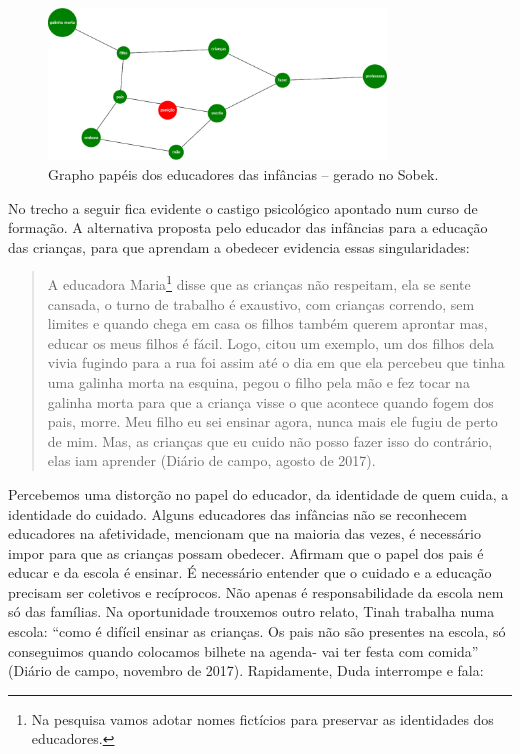 \documentclass{textolivre}
\begin{document}
\begin{figure}[h!]
 \centering
 \includegraphics[width=0.8\textwidth]{figure08.pdf}
 \caption{Grapho papéis dos educadores das infâncias -- gerado no Sobek.}
 \label{fig-fig08}
\end{figure}


No trecho a seguir fica evidente o castigo psicológico apontado num curso de formação. A alternativa proposta pelo educador das infâncias para a educação das crianças, para que aprendam a obedecer evidencia essas singularidades:

\begin{quote}
A educadora Maria\footnote{Na pesquisa vamos adotar nomes fictícios para preservar as identidades dos educadores.} disse que as crianças não respeitam, ela se sente cansada, o turno de trabalho é exaustivo, com crianças correndo, sem limites e quando chega em casa os filhos também querem aprontar mas, educar os meus filhos é fácil. Logo, citou um exemplo, um dos filhos dela vivia fugindo para a rua foi assim até o dia em que ela percebeu que tinha uma galinha morta na esquina, pegou o filho pela mão e fez tocar na galinha morta para que a criança visse o que acontece quando fogem dos pais, morre. Meu filho eu sei ensinar agora, nunca mais ele fugiu de perto de mim. Mas, as crianças que eu cuido não posso fazer isso do contrário, elas iam aprender (Diário de campo, agosto de 2017). 
\end{quote}

Percebemos uma distorção no papel do educador, da identidade de quem cuida, a identidade do cuidado. Alguns educadores das infâncias não se reconhecem educadores na afetividade, mencionam que na maioria das vezes, é necessário impor para que as crianças possam obedecer. Afirmam que o papel dos pais é educar e da escola é ensinar. É necessário entender que o cuidado e a educação precisam ser coletivos e recíprocos. Não apenas é responsabilidade da escola nem só das famílias. Na oportunidade trouxemos outro relato, Tinah trabalha numa escola: “como é difícil ensinar as crianças. Os pais não são presentes na escola, só conseguimos quando colocamos bilhete na agenda- vai ter festa com comida” (Diário de campo, novembro de 2017). Rapidamente, Duda interrompe e fala:
\end{document}
